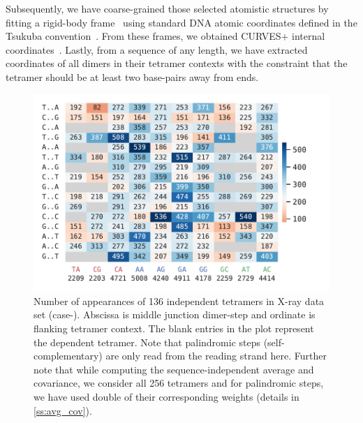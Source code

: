 Subsequently, we have coarse-grained those selected atomistic structures by fitting a rigid-body frame~\cite{svdfit} using standard DNA atomic coordinates defined in the Tsukuba convention~\cite{tsukuba}. From these frames, we obtained 
 CURVES$+$ internal coordinates~\cite{curveplus}. Lastly, from a sequence of any length, we have extracted coordinates of all dimers in their tetramer contexts with the constraint that the tetramer should be at least two base-pairs away from ends.

\begin{figure}[htb!]
	\begin{center}
	\centering\includegraphics[scale=1]{./Xray_images/freq_heat_map_tt3_3S_C1_cg_unsym.pdf}
	\centering\caption{
	Number of appearances of 136 independent tetramers in X-ray data set (case-). Abscissa is middle junction dimer-step and ordinate is flanking tetramer context. The blank entries in the plot represent the dependent tetramer. Note that palindromic steps (self-complementary) are only read from the reading strand here. Further note that while computing the sequence-independent average and covariance, we consider all 256 tetramers and for palindromic steps, we have used double of their corresponding weights (details in \cref{ss:avg_cov}).
}
\label{fig:freq}
\end{center}
\end{figure}
\color{black}

